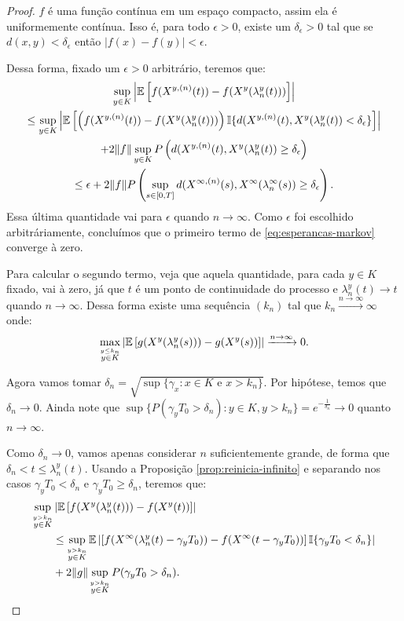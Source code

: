 \begin{proof}
  $f$ é uma função contínua em um espaço compacto, assim ela é
  uniformemente contínua. Isso é, para todo $\epsilon > 0$, existe um
  $\delta_\epsilon > 0$ tal que se $d(x, y) < \delta_\epsilon$ então
  $|f(x)-f(y)| < \epsilon$.

  Dessa forma, fixado um $\epsilon > 0$ arbitrário, teremos que:
  \begin{gather*}
    \sup_{y\in K} \left\lvert {\mathbb{E}} \left[ f(X^{y,(n)}(t)) -
        f(X^{y}(\lambda_n^y(t))) \right]
    \right\rvert\\
    \leq \sup_{y\in K} \left\lvert {\mathbb{E}} \left[ \left(f(X^{y,(n)}(t)) -
          f(X^{y}(\lambda_n^y(t))) \right) {\mathbb{I}}\{ d(X^{y, (n)}(t),
        X^y(\lambda_n^y(t)) < \delta_\epsilon \} \right]
    \right\rvert \\
    + 2\Vert f \Vert \sup_{y \in K} P\left( d(X^{y, (n)}(t),
      X^y(\lambda_n^y(t)) \geq
      \delta_\epsilon \right) \\
    \leq \epsilon + 2 \Vert f \Vert P \left( \sup_{s \in [0, T]}d(X^{\infty, (n)}(s),
      X^\infty(\lambda_n^\infty(s)) \geq \delta_\epsilon \right).
  \end{gather*}
  Essa última quantidade vai para $\epsilon$ quando $n\to
  \infty$. Como $\epsilon$ foi escolhido arbitráriamente, concluímos
  que o primeiro termo de \eqref{eq:esperancas-markov} converge à
  zero.

  Para calcular o segundo termo, veja que aquela quantidade, para cada
  $y \in K$ fixado, vai à zero, já que $t$ é \qc um ponto de
  continuidade do processo e $\lambda_n^y(t) \to t$ quando
  $n\to\infty$. Dessa forma existe uma sequência $(k_n)$ tal que $k_n
  \xrightarrow{n\to\infty} \infty$ onde:
  \begin{displaymath}
      \max_{\stackrel{y \leq k_n}{y\in K}} \left\lvert
      {\mathbb{E}} \left[g(X^y(\lambda_n^y(s))) - g(X^y(s)) \right]
    \right\rvert \xrightarrow{n\to \infty} 0.
  \end{displaymath}

  Agora vamos tomar $\delta_n = \sqrt{\sup\{ \gamma_x: x \in K
    \textrm{ e } x > k_n\}}$. Por hipótese, temos que $\delta_n \to
  0$. Ainda note que $\sup \{ P(\gamma_y T_0 > \delta_n) : y \in K, y
  > k_n \} = e^{-\frac{1}{\delta_n}} \to 0$ quanto $n \to \infty$.

  Como $\delta_n \to 0$, vamos apenas considerar $n$ suficientemente
  grande, de forma que $\delta_n < t \leq \lambda_n^y(t)$. Usando a
  Proposição \ref{prop:reinicia-infinito} e separando nos casos
  $\gamma_yT_0 < \delta_n$ e $\gamma_yT_0 \geq \delta_n$, teremos que:
  \begin{align}
    \label{eq:markov-quase-la}
    \sup_{\stackrel{y > k_n}{y \in K}}& \left\lvert {\mathbb{E}} \left[f(X^y(\lambda_n^y(t))) -
        f(X^y(t)) \right]
    \right\rvert \notag \\
    &\leq \sup_{\stackrel{y > k_n}{y \in K}} {\mathbb{E}} \left\lvert
      \left[f(X^\infty(\lambda_n^y(t)-\gamma_yT_0)) -
        f(X^\infty(t-\gamma_yT_0)) \right] {\mathbb{I}}\{ \gamma_yT_0 <
      \delta_n \}
    \right\rvert\\
    &+ 2 \Vert g \Vert \sup_{\stackrel{y > k_n}{y \in K}} P(\gamma_y T_0 > \delta_n).
    \notag
  \end{align}


\end{proof}

